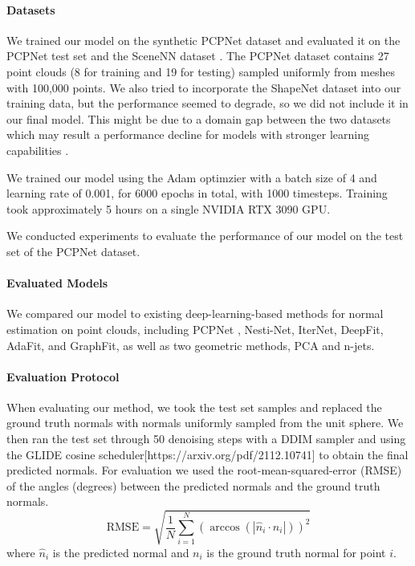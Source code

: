 \documentclass{acmart}
\begin{document}
\paragraph{Datasets}
We trained our model on the synthetic PCPNet dataset \cite{guerrero2018pcpnet} and evaluated it on the PCPNet test set and the SceneNN dataset \cite{scenenn-3dv16}. The PCPNet dataset contains 27 point clouds (8 for training and 19 for testing) sampled uniformly from meshes with 100,000 points. We also tried to incorporate the ShapeNet dataset \cite{chang2015shapenet} into our training data, but the performance seemed to degrade, so we did not include it in our final model. This might be due to a domain gap between the two datasets which may result a performance decline for models with stronger learning capabilities \cite{arXiv:2406.09681}.

We trained our model using the Adam optimzier with a batch size of 4 and learning rate of 0.001, for 6000 epochs in total, with 1000 timesteps. Training took approximately 5 hours on a single NVIDIA RTX 3090 GPU.

We conducted experiments to evaluate the performance of our model on the test set of the PCPNet dataset.

\paragraph{Evaluated Models}
We compared our model to existing deep-learning-based methods for normal estimation on point clouds, including PCPNet \cite{guerrero2018pcpnet}, Nesti-Net, IterNet, DeepFit, AdaFit, and GraphFit, as well as two geometric methods, PCA and n-jets.
\paragraph{Evaluation Protocol}
When evaluating our method, we took the test set samples and replaced the ground truth normals with normals uniformly sampled from the unit sphere. We then ran the test set through 50 denoising steps with a DDIM sampler and using the GLIDE cosine scheduler[https://arxiv.org/pdf/2112.10741] to obtain the final predicted normals.
For evaluation we used the root-mean-squared-error (RMSE) of the angles (degrees) between the predicted normals and the ground truth normals.
\begin{equation}
    \text{RMSE} = \sqrt{\frac{1}{N}\sum_{i=1}^{N}(\arccos(|\hat{n}_i \cdot n_i|))^2}
\end{equation}
where $\hat{n}_i$ is the predicted normal and $n_i$ is the ground truth normal for point $i$.
\end{document}
